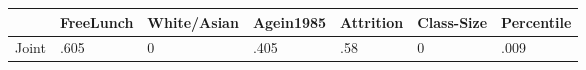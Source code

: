 \begin{table}[htbp]
\begin{tabular}{lllllll} \hline \hline
 & FreeLunch  & White/Asian  & Agein1985  & Attrition  & Class-Size  & Percentile  \\  \hline 
Joint & .605 & 0 & .405 & .58 & 0 & .009 \\  
\hline \hline \end{tabular}
\end{table}
